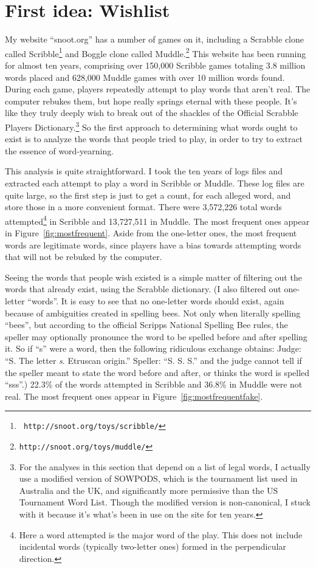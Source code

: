 \documentclass[twocolumn]{article}
\begin{document}
\section{First idea: Wishlist}

My website ``{\sf snoot.org}'' has a number of games on it, including
a Scrabble clone called Scribble\footnote{{\tt
    http://snoot.org/toys/scribble/}} and Boggle clone called
Muddle.\!\footnote{{\tt http://snoot.org/toys/muddle/}} This website
has been running for almost ten years, comprising over 150,000
Scribble games totaling 3.8 million words placed and 628,000 Muddle
games with over 10 million words found. During each game, players
repeatedly attempt to play words that aren't real. The computer
rebukes them, but hope really springs eternal with these people. It's
like they truly deeply wish to break out of the shackles of the
Official Scrabble Players Dictionary.\!\footnote{For the analyses in
  this section that depend on a list of legal words, I actually use a
  modified version of SOWPODS, which is the tournament list used in
  Australia and the UK, and significantly more permissive than the US
  Tournament Word List. Though the modified version is non-canonical,
  I stuck with it because it's what's been in use on the site for
  ten years.} So the first approach to determining what
words ought to exist is to analyze the words that people tried to
play, in order to try to extract the essence of word-yearning.

This analysis is quite straightforward. I took the ten years of logs
files and extracted each attempt to play a word in Scribble or Muddle.
These log files are quite large, so the first step is just to get a
count, for each alleged word, and store those in a more convenient
format. There were 3,572,226 total words attempted\footnote{Here a
  word attempted is the major word of the play. This does not include
  incidental words (typically two-letter ones) formed in the
  perpendicular direction.} in Scribble and 13,727,511 in Muddle. The
most frequent ones appear in Figure~\ref{fig:mostfrequent}. Aside from
the one-letter ones, the most frequent words are legitimate words,
since players have a bias towards attempting words that will not be
rebuked by the computer.

Seeing the words that people wish existed is a simple matter of
filtering out the words that already exist, using the Scrabble
dictionary. (I also filtered out one-letter ``words''. It is easy to
see that no one-letter words should exist, again because of
ambiguities created in spelling bees. Not only when literally spelling
``bees'', but according to the official Scripps National Spelling Bee
rules, the speller may optionally pronounce the word to be spelled
before and after spelling it. So if ``s'' were a word, then the
following ridiculous exchange obtains: Judge: ``S. The letter {\it s}.
Etruscan origin.'' Speller: ``S. S. S.'' and the judge cannot tell if
the speller meant to state the word before and after, or thinks the
word is spelled ``sss''.) 22.3\% of the words attempted in Scribble
and 36.8\% in Muddle were not real. The most frequent ones appear in
Figure~\ref{fig:mostfrequentfake}.
\end{document}
